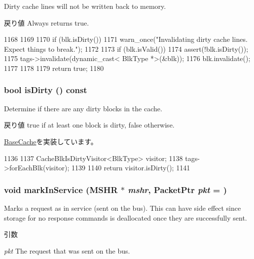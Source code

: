 Dirty cache lines will not be written back to memory.

\begin{DoxyReturn}{戻り値}
Always returns true. 
\end{DoxyReturn}



\begin{DoxyCode}
1168 {
1169 
1170     if (blk.isDirty())
1171         warn_once("Invalidating dirty cache lines. Expect things to break.\n");
1172 
1173     if (blk.isValid()) {
1174         assert(!blk.isDirty());
1175         tags->invalidate(dynamic_cast< BlkType *>(&blk));
1176         blk.invalidate();
1177     }
1178 
1179     return true;
1180 }
\end{DoxyCode}
\hypertarget{classCache_ad66f409af3c387e166ff7ee95169b7b6}{
\subsubsection[{isDirty}]{\setlength{\rightskip}{0pt plus 5cm}bool isDirty () const}}
\label{classCache_ad66f409af3c387e166ff7ee95169b7b6}
Determine if there are any dirty blocks in the cache.

\begin{DoxyReturn}{戻り値}
true if at least one block is dirty, false otherwise. 
\end{DoxyReturn}


\hyperlink{classBaseCache_a373dc1334f26db2ba94e827f3c9adc83}{BaseCache}を実装しています。


\begin{DoxyCode}
1136 {
1137     CacheBlkIsDirtyVisitor<BlkType> visitor;
1138     tags->forEachBlk(visitor);
1139 
1140     return visitor.isDirty();
1141 }
\end{DoxyCode}
\hypertarget{classCache_ac7fb6ca824d25de54878584fd9dd8162}{
\subsubsection[{markInService}]{\setlength{\rightskip}{0pt plus 5cm}void markInService ({\bf MSHR} $\ast$ {\em mshr}, \/  {\bf PacketPtr} {\em pkt} = {})}}
\label{classCache_ac7fb6ca824d25de54878584fd9dd8162}
Marks a request as in service (sent on the bus). This can have side effect since storage for no response commands is deallocated once they are successfully sent. 
\begin{DoxyParams}{引数}
\item[{\em pkt}]The request that was sent on the bus. \end{DoxyParams}



